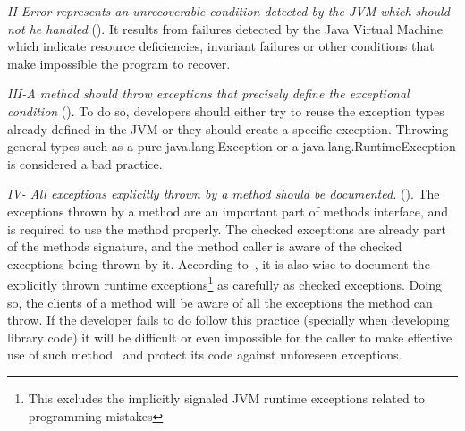 \documentclass[conference]{IEEEtran}
\begin{document}
\emph{II-Error represents an unrecoverable condition detected by the JVM which
should not he handled} (\cite{gosling2000java}). It results from failures detected
by the Java Virtual Machine which indicate resource deficiencies, invariant
failures or other conditions that make impossible the program to recover.


\emph{III-A method should throw exceptions that precisely define the
exceptional condition} (\cite{gosling2000java,bloch2008effective}). To do so,
developers should either try to reuse the exception types already defined in the
JVM or they should create a specific exception. Throwing general types such as a
pure java.lang.Exception or a java.lang.RuntimeException is considered a bad practice.



\emph{IV- All exceptions explicitly thrown by a method should be documented.}
(\cite{mandrioli1992advances,gosling2000java,wirfs2006toward,bloch2008effective}).
The exceptions thrown by a method are an important part of methods interface,
and is required to use the method properly. The checked exceptions are already
part of the  methods signature, and the method caller is aware of the checked
exceptions being thrown by it. According to~\cite{bloch2008effective}, it is
also wise to document the explicitly thrown runtime exceptions\footnote{This
excludes the implicitly signaled JVM runtime exceptions related to programming
mistakes} as carefully as checked exceptions. Doing so, the clients of a method
will be aware of all the exceptions the method can throw. If the developer fails to
do follow this practice (specially when developing library code) it will be
difficult or even impossible for the caller to make effective use of such 
method~\cite{wirfs2006toward, bloch2008effective} and protect its code
against unforeseen exceptions. 
\end{document}
